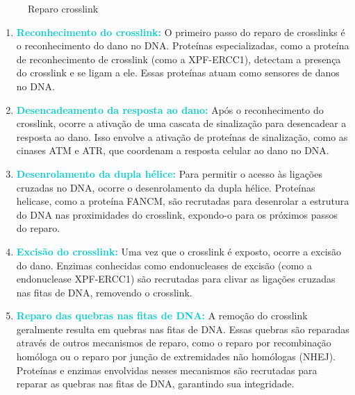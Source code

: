 \documentclass[11pt,a4paper]{article}
\begin{document}
	\begin{figure}[h]
		\centering
		\caption{Reparo crosslink}
		\label{fig:reparoCrossLink}
	\end{figure}

	\begin{enumerate}[label=\textcolor{CarnationPink}{\arabic*${}^\circ $}]
		\item \textcolor{DarkTurquoise}{\textbf{Reconhecimento do crosslink:}} O primeiro passo do reparo de crosslinks é o reconhecimento do dano no DNA. Proteínas especializadas, como a proteína de reconhecimento de crosslink (como a XPF-ERCC1), detectam a presença do crosslink e se ligam a ele. Essas proteínas atuam como sensores de danos no DNA.
		\item \textcolor{DarkTurquoise}{\textbf{Desencadeamento da resposta ao dano:}} Após o reconhecimento do crosslink, ocorre a ativação de uma cascata de sinalização para desencadear a resposta ao dano. Isso envolve a ativação de proteínas de sinalização, como as cinases ATM e ATR, que coordenam a resposta celular ao dano no DNA.
		\item \textcolor{DarkTurquoise}{\textbf{Desenrolamento da dupla hélice:}} Para permitir o acesso às ligações cruzadas no DNA, ocorre o desenrolamento da dupla hélice. Proteínas helicase, como a proteína FANCM, são recrutadas para desenrolar a estrutura do DNA nas proximidades do crosslink, expondo-o para os próximos passos do reparo.
		\item \textcolor{DarkTurquoise}{\textbf{Excisão do crosslink:}} Uma vez que o crosslink é exposto, ocorre a excisão do dano. Enzimas conhecidas como endonucleases de excisão (como a endonuclease XPF-ERCC1) são recrutadas para clivar as ligações cruzadas nas fitas de DNA, removendo o crosslink.
		\item \textcolor{DarkTurquoise}{\textbf{Reparo das quebras nas fitas de DNA:}} A remoção do crosslink geralmente resulta em quebras nas fitas de DNA. Essas quebras são reparadas através de outros mecanismos de reparo, como o reparo por recombinação homóloga ou o reparo por junção de extremidades não homólogas (NHEJ). Proteínas e enzimas envolvidas nesses mecanismos são recrutadas para reparar as quebras nas fitas de DNA, garantindo sua integridade.
	\end{enumerate}
\end{document}
